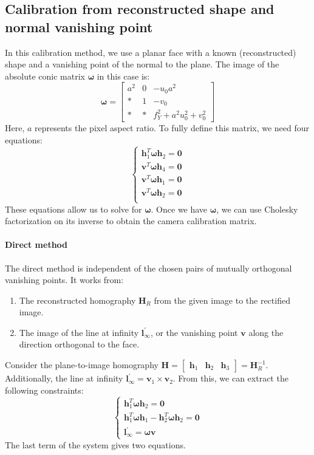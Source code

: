 \subsection{Calibration from reconstructed shape and normal vanishing point}
In this calibration method, we use a planar face with a known (reconstructed) shape and a vanishing point of the normal to the plane.
The image of the absolute conic matrix $\boldsymbol{\omega}$ in this case is:
\[\boldsymbol{\omega}=\begin{bmatrix} a^{2} & 0 & -u_0a^{2} \\ \ast & 1 & -v_0 \\ \ast & \ast & f^2_Y+a^2u_0^2+v_0^2 \end{bmatrix}\]
Here, $a$ represents the pixel aspect ratio. 
To fully define this matrix, we need four equations:
\[\begin{cases}
    \mathbf{h}_1^T\boldsymbol{\omega}\mathbf{h}_2=\mathbf{0} \\
    \mathbf{v}^T\boldsymbol{\omega}\mathbf{h}_4=\mathbf{0} \\
    \mathbf{v}^T\boldsymbol{\omega}\mathbf{h}_1=\mathbf{0} \\
    \mathbf{v}^T\boldsymbol{\omega}\mathbf{h}_2=\mathbf{0} \\
\end{cases}\]
These equations allow us to solve for $\boldsymbol{\omega}$. 
Once we have $\boldsymbol{\omega}$, we can use Cholesky factorization on its inverse to obtain the camera calibration matrix.

\paragraph*{Direct method}
The direct method is independent of the chosen pairs of mutually orthogonal vanishing points. 
It works from:
\begin{enumerate}
    \item The reconstructed homography $\mathbf{H}_R$ from the given image to the rectified image.
    \item The image of the line at infinity $\mathbf{l}^{\prime}_{\infty}$, or the vanishing point $\mathbf{v}$ along the direction orthogonal to the face.
\end{enumerate}
Consider the plane-to-image homography $\mathbf{H}=\begin{bmatrix} \mathbf{h}_1 & \mathbf{h}_2 & \mathbf{h}_3 \end{bmatrix}=\mathbf{H}_R^{-1}$.
Additionally, the line at infinity $\mathbf{l}^{\prime}_{\infty}=\mathbf{v}_1\times \mathbf{v}_2$.
From this, we can extract the following constraints:
\[\begin{cases}
    \mathbf{h}_1^T\boldsymbol{\omega}\mathbf{h}_2 = \mathbf{0} \\
    \mathbf{h}_1^T\boldsymbol{\omega}\mathbf{h}_1 - \mathbf{h}_2^T\boldsymbol{\omega}\mathbf{h}_2 = \mathbf{0} \\ 
    \mathbf{l}_{\infty}^{\prime}=\boldsymbol{\omega}\mathbf{v}
\end{cases}\]
The last term of the system gives two equations.

